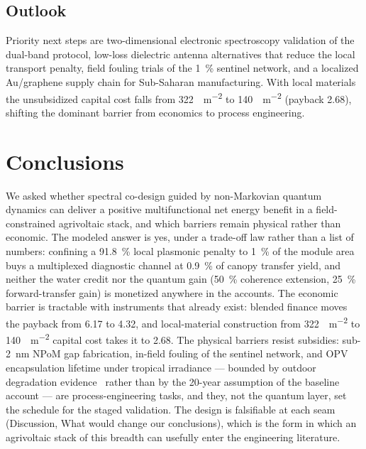 \documentclass[preprint,12pt]{elsarticle}
\begin{document}
\subsection{Outlook}
Priority next steps are two-dimensional electronic spectroscopy validation of the dual-band protocol, low-loss dielectric antenna alternatives that reduce the local transport penalty, field fouling trials of the \qty{1}{\percent} sentinel network, and a localized Au/graphene supply chain for Sub-Saharan manufacturing. With local materials the unsubsidized capital cost falls from \qty{322}{\USD\per\m\squared} to \qty{140}{\USD\per\m\squared} (payback \qty{2.68}{\yr}), shifting the dominant barrier from economics to process engineering.

\section{Conclusions}

We asked whether spectral co-design guided by non-Markovian quantum dynamics can deliver a positive multifunctional net energy benefit in a field-constrained agrivoltaic stack, and which barriers remain physical rather than economic. The modeled answer is yes, under a trade-off law rather than a list of numbers: confining a \qty{91.8}{\percent} local plasmonic penalty to \qty{1}{\percent} of the module area buys a multiplexed diagnostic channel at \qty{0.9}{\percent} of canopy transfer yield, and neither the water credit nor the quantum gain (\qty{50}{\percent} coherence extension, \qty{25}{\percent} forward-transfer gain) is monetized anywhere in the accounts. The economic barrier is tractable with instruments that already exist: blended finance moves the payback from \qty{6.17}{\yr} to \qty{4.32}{\yr}, and local-material construction from \qty{322}{\USD\per\m\squared} to \qty{140}{\USD\per\m\squared} capital cost takes it to \qty{2.68}{\yr}. The physical barriers resist subsidies: sub-\qty{2}{\nano\meter} NPoM gap fabrication, in-field fouling of the sentinel network, and OPV encapsulation lifetime under tropical irradiance --- bounded by outdoor degradation evidence~\cite{Zhang2018,Kettle2022} rather than by the 20-year assumption of the baseline account --- are process-engineering tasks, and they, not the quantum layer, set the schedule for the staged validation. The design is falsifiable at each seam (Discussion, What would change our conclusions), which is the form in which an agrivoltaic stack of this breadth can usefully enter the engineering literature.
\end{document}
